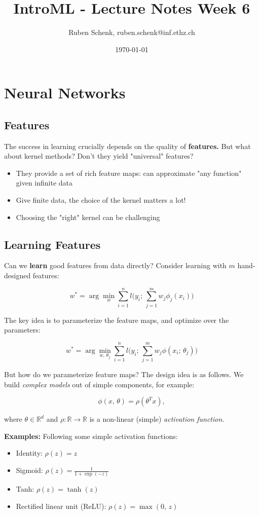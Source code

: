 \documentclass[a4paper]{extarticle}
\title{IntroML - Lecture Notes Week 6}
\author{Ruben Schenk, ruben.schenk@inf.ethz.ch}
\date{\today}
\begin{document}
\maketitle

\section{Neural Networks}

\subsection{Features}

The success in learning crucially depends on the quality of \textbf{features.} But what about kernel methods? Don't they yield "universal" features?
\begin{itemize}
    \item They provide a set of rich feature maps: can approximate "any function" given infinite data
    \item Give finite data, the choice of the kernel matters a lot!
    \item Choosing the "right" kernel can be challenging
\end{itemize}

\subsection{Learning Features}

Can we \textbf{learn} good features from data directly? Consider learning with $m$ hand-designed features:

\[
    w^* = \arg \min_w \sum_{i = 1}^n l \Big (y_i; \, \sum_{j = 1}^m w_j \phi_j(x_i)\Big )
\]

The key idea is to parameterize the feature maps, and optimize over the parameters:

\[
    w^* = \arg \min_{w, \, \theta_j} \sum_{i = 1}^n l \Big ( y_i; \, \sum_{j = 1}^m w_j \phi(x_i; \, \theta_j) \Big)
\]

But how do we parameterize feature maps? The design idea is as follows. We build \textit{complex models} out of simple components, for example:

\[
    \phi(x, \, \theta) = \rho (\theta^Tx),
\]

where $\theta \in \mathbb{R}^d$ and $\rho : \mathbb{R} \to \mathbb{R}$ is a non-linear (simple) \textit{activation function.}

\begin{ebox}
    \textbf{Examples:} Following some simple activation functions:
    \begin{itemize}
        \item Identity: $\rho(z) = z$
        \item Sigmoid: $\rho(z) = \frac{1}{1 + \exp(-z)}$
        \item Tanh: $\rho(z) = \tanh(z)$
        \item Rectified linear unit (ReLU): $\rho(z) = \max(0, \, z)$
    \end{itemize}
\end{ebox}
\end{document}
